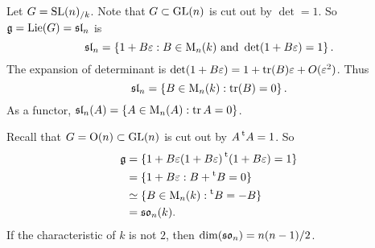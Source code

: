 \begin{example}
Let $G=\operatorname{SL}(n)_{/k}$. Note that $G\subset \operatorname{GL}(n)$ is cut out by $\det=1$. So 
$\mathfrak{g}=\operatorname{Lie}(G)=\mathfrak{sl}_n$ is 
\[
  \mathfrak{sl}_n = \left\{1+B\varepsilon:B\in \operatorname{M}_n(k)\text{ and }\det(1+B\varepsilon)=1\right\} .
\]
The expansion of determinant is 
$\det(1+B\varepsilon)=1+\operatorname{tr}(B)\varepsilon + O(\varepsilon^2)$. Thus 
\[
  \mathfrak{sl}_n = \left\{B\in \operatorname{M}_n(k):\operatorname{tr}(B)=0\right\} .
\]
As a functor, $\mathfrak{sl}_n(A)=\{A\in \operatorname{M}_n(A):\operatorname{tr} A=0\}$. 
\end{example}

\begin{example}[Orthogonal]
Recall that $G=\operatorname{O}(n)\subset \operatorname{GL}(n)$ is cut out by $A \prescript{\mathrm{t}}{}{A}=1$. So 
\begin{align*}
  \mathfrak{g}
    &= \{1+B\varepsilon  (1+B\varepsilon) \prescript{\mathrm{t}}{}{(1+B\varepsilon)}=1\} \\
    &= \{1+B\varepsilon:B+\prescript{\mathrm{t}}{}{B}=0\} \\
    &\simeq \{B\in \operatorname{M}_n(k):\prescript{\mathrm{t}}{}{B}=-B\} \\
    &= \mathfrak{so}_n(k) .
\end{align*}
If the characteristic of $k$ is not $2$, then $\dim(\mathfrak{so}_n)=n(n-1)/2$. 
\end{example}

